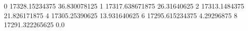 0 17328.15234375 36.830078125
1 17317.638671875 26.31640625
2 17313.1484375 21.826171875
4 17305.25390625 13.931640625
6 17295.615234375 4.29296875
8 17291.322265625 0.0
